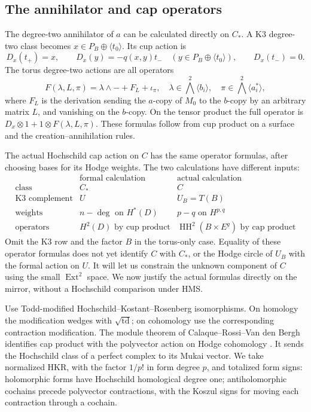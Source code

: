 \documentclass[11pt]{article}
\numberwithin{equation}{section}
\theoremstyle{definition}
\theoremstyle{remark}
\begin{document}
\subsection{The annihilator and cap operators}

The degree-two annihilator of \(a\) can be calculated directly on
\(C_*\).  A K3 degree-two class becomes
\(x\in P_B\oplus\langle t_0\rangle\).  Its cup action is
\begin{equation}\label{coh:lowering-k3}
 D_x(t_+)=x,\qquad
 D_x(y)=-q(x,y)t_-\quad
   (y\in P_B\oplus\langle t_0\rangle),\qquad
 D_x(t_-)=0.
\end{equation}
The torus degree-two actions are all operators
\begin{equation}\label{coh:lowering-torus}
 F(\lambda,L,\pi)=\lambda\wedge-+F_L+\iota_\pi,
 \quad
 \lambda\in\bigwedge^2\langle b_i\rangle,
 \quad \pi\in\bigwedge^2\langle a_i^*\rangle,
\end{equation}
where \(F_L\) is the derivation sending the \(a\)-copy of \(M_0\)
to the \(b\)-copy by an arbitrary matrix \(L\), and vanishing on the
\(b\)-copy.  On the tensor product the full operator is
\(D_x\otimes1+1\otimes F(\lambda,L,\pi)\).  These formulas follow
from cup product on a surface and the creation--annihilation rules.

The actual Hochschild cap action on \(C\) has the same operator
formulas, after choosing bases for its Hodge weights.  The two
calculations have different inputs:
\[
\begin{array}{c|c|c}
 &\text{formal calculation}&\text{actual calculation}\\ \hline
 \text{class}&C_*&C\\
 \text{K3 complement}&U&U_B=T(B)\\
 \text{weights}&n-\deg\text{ on }H^*(D)&p-q\text{ on }H^{p,q}\\
 \text{operators}&H^2(D)\text{ by cup product}
   &\operatorname{HH}^2(B\times E^g)\text{ by cap product}
\end{array}
\]
Omit the K3 row and the factor \(B\) in the torus-only case.
Equality of these operator formulas does not yet identify \(C\) with
\(C_*\), or the Hodge circle of \(U_B\) with the formal action on
\(U\).  It will let us constrain the unknown component of \(C\)
using the small \(\operatorname{Ext}^2\) space.  We now justify the actual formulas
directly on the mirror, without a Hochschild comparison under HMS.

Use Todd-modified Hochschild--Kostant--Rosenberg isomorphisms.  On
homology the modification wedges with \(\sqrt{\operatorname{td}}\); on cohomology
use the corresponding contraction modification.  The module theorem
of Calaque--Rossi--Van den Bergh identifies cap product with the
polyvector action on Hodge cohomology
\cite[Theorem~1.4]{CalaqueRossiVanDenBergh}.  It sends the Hochschild
class of a perfect complex to its Mukai vector.  We take normalized HKR,
with the factor \(1/p!\) in form degree \(p\), and totalized form
signs: holomorphic forms have Hochschild homological degree one;
antiholomorphic cochains precede polyvector contractions, with the
Koszul signs for moving each contraction through a cochain.
\end{document}
